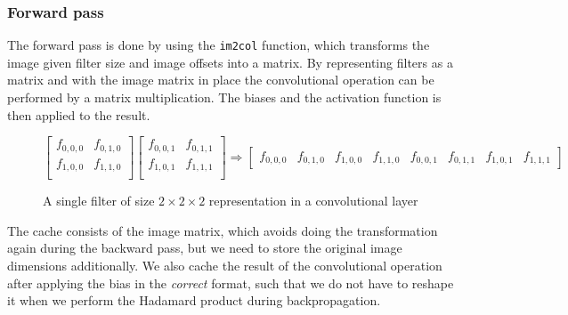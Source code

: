\subsubsection*{Forward pass}
The forward pass is done by using the \texttt{im2col} function, which transforms
the image given filter size and image offsets into a matrix. 
By representing filters as a matrix and with the image matrix in place the
convolutional operation can be performed by a matrix multiplication. 
The biases and the activation function is then applied to the result. 
\begin{figure}[!hbtp]
	\begin{displaymath}
	\begin{bmatrix}
	f_{0,0,0} & f_{0,1,0} \\ 
	f_{1,0,0} & f_{1,1,0}  \\  
	\end{bmatrix}
	\begin{bmatrix}
	f_{0,0,1} & f_{0,1,1} \\ 
	f_{1,0,1} & f_{1,1,1}  \\  
	\end{bmatrix}
	{\Rightarrow}
	\begin{bmatrix}
	f_{0,0,0} & f_{0,1,0} & f_{1,0,0} & f_{1,1,0} & f_{0,0,1} & f_{0,1,1} &
	f_{1,0,1} & f_{1,1,1}    
	\end{bmatrix}
	\end{displaymath}
	\caption{A single filter of size $2 \times 2 \times 2$ representation in a
		convolutional layer}
	\label{fig:filter}
\end{figure} \newline 
The cache consists of the image matrix, which avoids doing the transformation
again during the backward pass, but we need to store the original image
dimensions additionally. 
We also cache the result of the convolutional operation after applying the bias
in the \emph{correct} format, such that we do not have to reshape it when we
perform the Hadamard product during backpropagation. 
